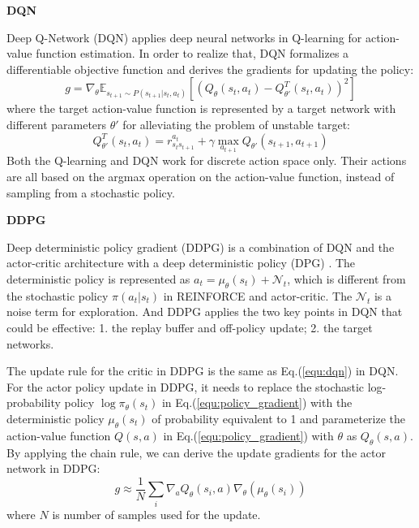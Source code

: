 \documentclass{article}
\begin{document}
\textbf{DQN}

Deep Q-Network (DQN) \cite{mnih2015human}\cite{mnih2013playing} applies deep neural networks in Q-learning for action-value function estimation. In order to realize that, DQN formalizes a differentiable objective function and derives the gradients for updating the policy:
\begin{equation}
\label{equ:dqn}
    g=\nabla_\theta \mathbb{E}_{s_{t+1}\sim P(s_{t+1}|s_t,a_t)}[(Q_\theta(s_t,a_t)-Q_{\theta'}^T (s_{t}, a_{t}))^2]
\end{equation}
where the target action-value function is represented by a target network with different parameters $\theta'$ for alleviating the problem of unstable target:
\begin{equation}
    Q_{\theta'}^T (s_{t}, a_{t}) = r^{a_t}_{s_t s_{t+1}}+\gamma\max_{a_{t+1}} Q_{\theta'}(s_{t+1},a_{t+1})
\end{equation}
Both the Q-learning and DQN work for discrete action space only. Their actions are all based on the argmax operation on the action-value function, instead of sampling from a stochastic policy.

\textbf{DDPG}

Deep deterministic policy gradient (DDPG) \cite{lillicrap2015continuous} is a combination of DQN and the actor-critic architecture with a deep deterministic policy (DPG) \cite{silver2014deterministic}. The deterministic policy is represented as $a_t=\mu_\theta(s_t)+\mathcal{N}_t$, which is different from the stochastic policy $\pi(a_t|s_t)$ in REINFORCE and actor-critic. The $\mathcal{N}_t$ is a noise term for exploration. And DDPG applies the two key points in DQN that could be effective: 1. the replay buffer and off-policy update; 2. the target networks.

The update rule for the critic in DDPG is the same as Eq.(\ref{equ:dqn}) in DQN. For the actor policy update in DDPG, it needs to replace the stochastic log-probability policy $\log \pi_\theta(s_t)$ in Eq.(\ref{equ:policy_gradient}) with the deterministic policy $\mu_\theta(s_t)$ of probability equivalent to 1 and parameterize the action-value function $Q(s,a)$ in Eq.(\ref{equ:policy_gradient}) with $\theta$ as $Q_\theta(s,a)$. By applying the chain rule, we can derive the update gradients for the actor network in DDPG:
\begin{equation}
    g\approx\frac{1}{N}\sum_i \nabla_a Q_\theta(s_i, a) \nabla_\theta(\mu_\theta(s_i))
\end{equation}
where $N$ is number of samples used for the update.
\end{document}
